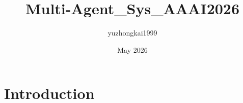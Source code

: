 \documentclass{article}
\title{Multi-Agent_Sys_AAAI2026}
\author{yuzhongkai1999 }
\date{May 2026}
\begin{document}
\maketitle

\section{Introduction}
\end{document}

